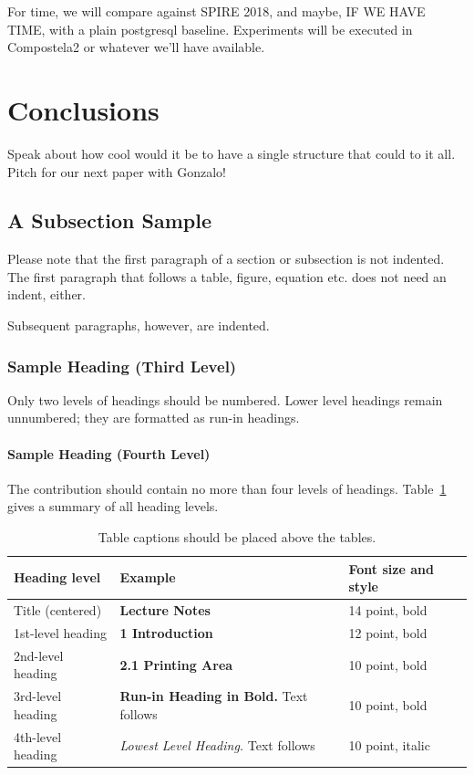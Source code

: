 \documentclass[runningheads]{llncs}
\begin{document}
For time, we will compare against SPIRE 2018, and maybe, IF WE HAVE TIME, with a plain postgresql baseline. Experiments will be executed in Compostela2 or whatever we'll have available.

\section{Conclusions}
Speak about how cool would it be to have a single structure that could to it all. Pitch for our next paper with Gonzalo!

\subsection{A Subsection Sample}
Please note that the first paragraph of a section or subsection is
not indented. The first paragraph that follows a table, figure,
equation etc. does not need an indent, either.

Subsequent paragraphs, however, are indented.

\subsubsection{Sample Heading (Third Level)} Only two levels of
headings should be numbered. Lower level headings remain unnumbered;
they are formatted as run-in headings.

\paragraph{Sample Heading (Fourth Level)}
The contribution should contain no more than four levels of
headings. Table~\ref{tab1} gives a summary of all heading levels.

\begin{table}
\caption{Table captions should be placed above the
tables.}\label{tab1}
\begin{tabular}{|l|l|l|}
\hline
Heading level &  Example & Font size and style\\
\hline
Title (centered) &  {\Large\bfseries Lecture Notes} & 14 point, bold\\
1st-level heading &  {\large\bfseries 1 Introduction} & 12 point, bold\\
2nd-level heading & {\bfseries 2.1 Printing Area} & 10 point, bold\\
3rd-level heading & {\bfseries Run-in Heading in Bold.} Text follows & 10 point, bold\\
4th-level heading & {\itshape Lowest Level Heading.} Text follows & 10 point, italic\\
\hline
\end{tabular}
\end{table}
\end{document}
